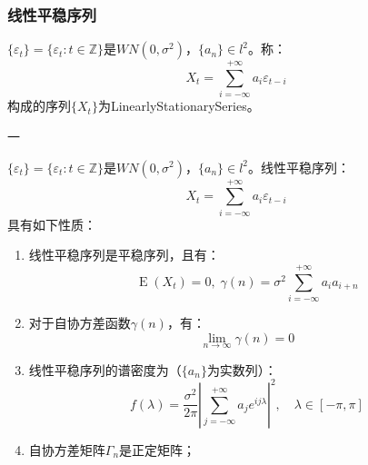 \subsubsection{线性平稳序列}
\begin{definition}
	$\{\varepsilon_t\}=\{\varepsilon_t:t\in\mathbb{Z}\}$是$WN(0,\sigma^2)$，$\{a_n\}\in l^2$。称：
	\begin{equation*}
		X_t=\sum_{i=-\infty}^{+\infty}a_i\varepsilon_{t-i}
	\end{equation*}
	构成的序列$\{X_t\}$为\gls{LinearlyStationarySeries}。
\end{definition}
一
\begin{property}\label{prop:LinearlyStationarySeries}
	$\{\varepsilon_t\}=\{\varepsilon_t:t\in\mathbb{Z}\}$是$WN(0,\sigma^2)$，$\{a_n\}\in l^2$。线性平稳序列：
	\begin{equation*}
		X_t=\sum_{i=-\infty}^{+\infty}a_i\varepsilon_{t-i}
	\end{equation*}
	具有如下性质：
	\begin{enumerate}
		\item 线性平稳序列是平稳序列，且有：
		\begin{equation*}
			\operatorname{E}(X_t)=0,\;\gamma(n)=\sigma^2\sum_{i=-\infty}^{+\infty}a_ia_{i+n}
		\end{equation*}
		\item 对于自协方差函数$\gamma(n)$，有：
		\begin{equation*}
			\lim_{n\to\infty}\gamma(n)=0
		\end{equation*}\par
		\item 线性平稳序列的谱密度为（$\{a_n\}$为实数列）：
		\begin{equation*}
			f(\lambda)=\frac{\sigma^2}{2\pi}\left|\sum_{j=-\infty}^{+\infty}a_je^{ij\lambda}\right|^2,\quad\lambda\in[-\pi,\pi]
		\end{equation*}
		\item 自协方差矩阵$\Gamma_n$是正定矩阵；
	\end{enumerate}
\end{property}
